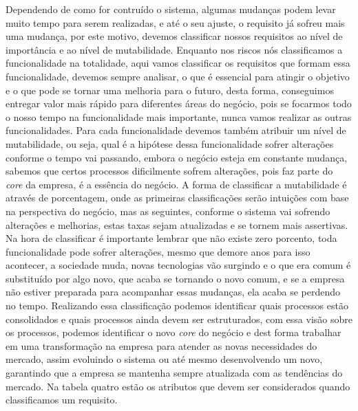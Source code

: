         Dependendo de como for contruído o sistema, algumas mudanças podem levar
        muito tempo para serem realizadas, e até o seu ajuste, o requisito já sofreu
        mais uma mudança, por este motivo, devemos classificar nossos requisitos
        ao nível de importância e ao nível de mutabilidade. Enquanto nos riscos
        nós classificamos a funcionalidade na totalidade, aqui vamos classificar
        os requisitos que formam essa funcionalidade, devemos sempre analisar, o que
        é essencial para atingir o objetivo e o que pode se tornar uma melhoria para
        o futuro, desta forma, conseguimos entregar valor mais rápido para diferentes
        áreas do negócio, pois se focarmos todo o nosso tempo na funcionalidade
        mais importante, nunca vamos realizar as outras funcionalidades. Para cada
        funcionalidade devemos também atribuir um nível de mutabilidade, ou seja,
        qual é a hipótese dessa funcionalidade sofrer alterações conforme o tempo
        vai passando, embora o negócio esteja em constante mudança, sabemos que
        certos processos dificilmente sofrem alterações, pois faz parte do \textit{core}
        da empresa, é a essência do negócio. A forma de classificar a mutabilidade
        é através de porcentagem, onde as primeiras classificações serão intuições
        com base na perspectiva do negócio, mas as seguintes, conforme o sistema
        vai sofrendo alterações e melhorias, estas taxas sejam atualizadas e se
        tornem mais assertivas. Na hora de classificar é importante lembrar que
        não existe zero porcento, toda funcionalidade pode sofrer alterações,
        mesmo que demore anos para isso acontecer, a sociedade muda, novas
        tecnologias vão surgindo e o que era comum é substituído por algo novo,
        que acaba se tornando o novo comum, e se a empresa não estiver preparada
        para acompanhar essas mudanças, ela acaba se perdendo no tempo. Realizando
        essa classificação podemos identificar quais processos estão consolidados
        e quais processos ainda devem ser estruturados, com essa visão sobre os
        processos, podemos identificar o novo \textit{core} do negócio e dest
        forma trabalhar em uma transformação na empresa para atender as novas
        necessidades do mercado, assim evoluindo o sistema ou até mesmo desenvolvendo
        um novo, garantindo que a empresa se mantenha sempre atualizada com as
        tendências do mercado. Na tabela quatro estão os atributos que devem ser
        considerados quando classificamos um requisito. \newline

